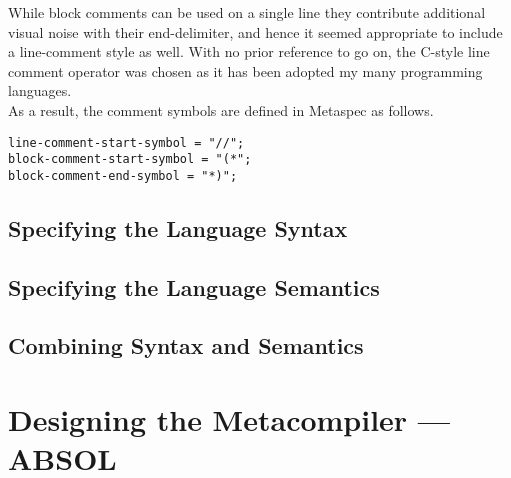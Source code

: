 While block comments can be used on a single line they contribute additional visual noise with their end-delimiter, and hence it seemed appropriate to include a line-comment style as well.
With no prior reference to go on, the C-style line comment operator was chosen as it has been adopted my many programming languages. \\

As a result, the comment symbols are defined in Metaspec as follows.
\begin{lstlisting}[caption={Metaspec Comment Symbols}, label={lst:metaspec_comment_symbols}, numbers=none]
line-comment-start-symbol = "//";
block-comment-start-symbol = "(*";
block-comment-end-symbol = "*)";
\end{lstlisting}



\subsection{Specifying the Language Syntax} %
\label{sub:specifying_the_language_syntax}


\subsection{Specifying the Language Semantics} %
\label{sub:specifying_the_language_semantics}


\subsection{Combining Syntax and Semantics} %
\label{sub:combining_syntax_and_semantics}



\section{Designing the Metacompiler --- ABSOL} %
\label{sec:designing_the_metacompiler_absol}


